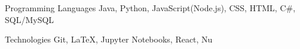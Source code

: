 


\begin{cvskills}


\cvskill
{Programming Languages} %
{Java, Python, JavaScript(Node.js), CSS, HTML, C\#, SQL/MySQL} %


\cvskill
{Technologies} %
{Git,  \textrm{\LaTeX}, Jupyter Notebooks, React, Nu} %





\end{cvskills}